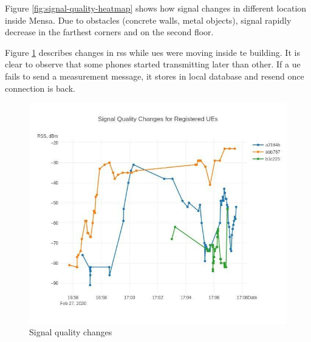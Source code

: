 Figure \ref{fig:signal-quality-heatmap} shows how signal changes in different location inside Mensa. Due to obstacles (concrete walls, metal objects), signal rapidly decrease in the farthest corners and on the second floor.

Figure \ref{fig:signal-quality-changes} describes changes in \gls{rss} while \glspl{ue} were moving inside te building. It is clear to observe that some phones started transmitting later than other. If a \gls{ue} fails to send a measurement message, it stores in local database and resend once connection is back.


\begin{figure}[H]
	\centering
	\includegraphics[width=\linewidth,keepaspectratio]{images/experiment_3_3.jpg}
\caption{Signal quality changes}
\label{fig:signal-quality-changes}
\end{figure}
